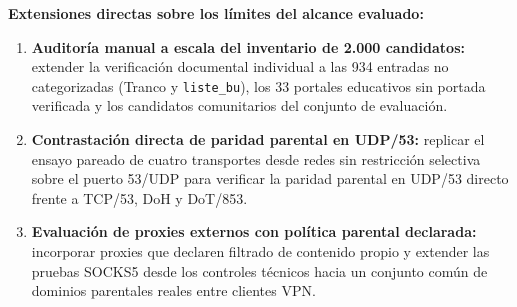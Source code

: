 \documentclass[10pt,a4paper]{article}
\begin{document}
\textbf{Extensiones directas sobre los límites del alcance evaluado:}
\begin{enumerate}
\item \textbf{Auditoría manual a escala del inventario de 2.000 candidatos:} extender la verificación documental individual a las 934 entradas no categorizadas (Tranco y \texttt{liste\_bu}), los 33 portales educativos sin portada verificada y los candidatos comunitarios del conjunto de evaluación.
\item \textbf{Contrastación directa de paridad parental en UDP/53:} replicar el ensayo pareado de cuatro transportes desde redes sin restricción selectiva sobre el puerto 53/UDP para verificar la paridad parental en UDP/53 directo frente a TCP/53, DoH y DoT/853.
\item \textbf{Evaluación de proxies externos con política parental declarada:} incorporar proxies que declaren filtrado de contenido propio y extender las pruebas SOCKS5 desde los controles técnicos hacia un conjunto común de dominios parentales reales entre clientes VPN.
\end{enumerate}
\end{document}
